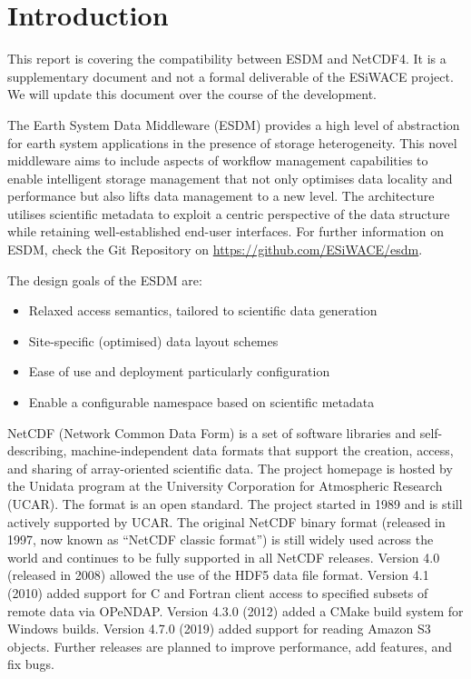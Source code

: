 \chapter{Introduction}
\label{ch:intro}


This report is covering the compatibility between ESDM and NetCDF4. It is a supplementary document and not a formal deliverable of the ESiWACE project. We will update this document over the course of the development.

The Earth System Data Middleware (ESDM) provides a high level of abstraction for earth system applications in the presence of storage heterogeneity. This novel middleware aims to include aspects of workflow management capabilities to enable intelligent storage management that not only optimises data locality and performance but also lifts data management to a new level. The architecture utilises scientific metadata to exploit a centric perspective of the data structure while retaining well-established end-user interfaces. For further information on ESDM, check the Git Repository on \url{https://github.com/ESiWACE/esdm}.

The design goals of the ESDM are:

\begin{itemize}

\item Relaxed access semantics, tailored to scientific data generation

\item Site-specific (optimised) data layout schemes

\item Ease of use and deployment particularly configuration

\item Enable a configurable namespace based on scientific metadata

\end{itemize}

NetCDF (Network Common Data Form) is a set of software libraries and self-describing, machine-independent data formats that support the creation, access, and sharing of array-oriented scientific data. The project homepage is hosted by the Unidata program at the University Corporation for Atmospheric Research (UCAR). The format is an open standard. The project started in 1989 and is still actively supported by UCAR. The original NetCDF binary format (released in 1997, now known as ``NetCDF classic format'') is still widely used across the world and continues to be fully supported in all NetCDF releases. Version 4.0 (released in 2008) allowed the use of the HDF5 data file format. Version 4.1 (2010) added support for C and Fortran client access to specified subsets of remote data via OPeNDAP. Version 4.3.0 (2012) added a CMake build system for Windows builds. Version 4.7.0 (2019) added support for reading Amazon S3 objects. Further releases are planned to improve performance, add features, and fix bugs.

